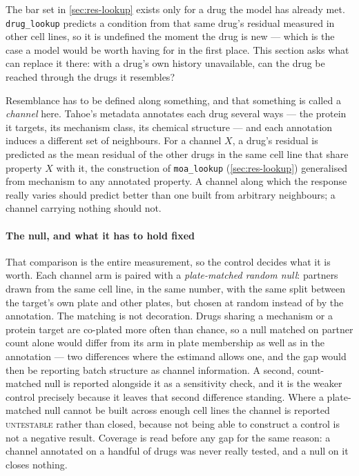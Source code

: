 \noindent
The bar set in \cref{sec:res-lookup} exists only for a drug the model has already
met. \texttt{drug\_lookup} predicts a condition from that same drug's residual
measured in other cell lines, so it is undefined the moment the drug is new ---
which is the case a model would be worth having for in the first place. This
section asks what can replace it there: with a drug's own history unavailable, can
the drug be reached through the drugs it resembles?

Resemblance has to be defined along something, and that something is called a
\emph{channel} here. Tahoe's metadata annotates each drug several ways --- the
protein it targets, its mechanism class, its chemical structure --- and each
annotation induces a different set of neighbours. For a channel $X$, a drug's
residual is predicted as the mean residual of the other drugs in the same cell
line that share property $X$ with it, the construction of \texttt{moa\_lookup}
(\cref{sec:res-lookup}) generalised from mechanism to any annotated property. A
channel along which the response really varies should predict better than one
built from arbitrary neighbours; a channel carrying nothing should not.

\paragraph{The null, and what it has to hold fixed} That comparison is the entire
measurement, so the control decides what it is worth. Each channel arm is paired
with a \emph{plate-matched random null}: partners drawn from the same cell line,
in the same number, with the same split between the target's own plate and other
plates, but chosen at random instead of by the annotation. The matching is not
decoration. Drugs sharing a mechanism or a protein target are co-plated more often
than chance, so a null matched on partner count alone would differ from its arm in
plate membership as well as in the annotation --- two differences where the
estimand allows one, and the gap would then be reporting batch structure as
channel information. A second, count-matched null is reported alongside it as a
sensitivity check, and it is the weaker control precisely because it leaves that
second difference standing. Where a plate-matched null cannot be built across
enough cell lines the channel is reported \textsc{untestable} rather than closed,
because not being able to construct a control is not a negative result. Coverage
is read before any gap for the same reason: a channel annotated on a handful of
drugs was never really tested, and a null on it closes nothing.

